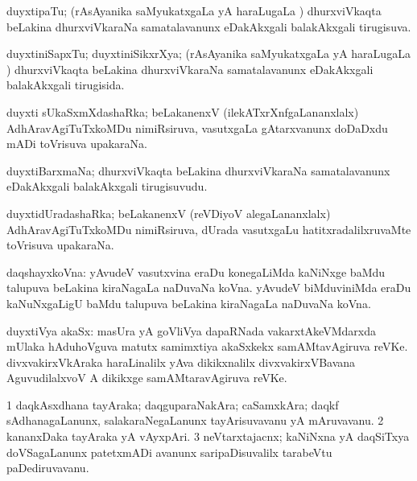 \bentry
{}
\gl{\gu}
\bmng
duyxtipaTu; (rAsAyanika saMyukatxgaLa yA haraLugaLa \vi) dhurxviVkaqta beLakina dhurxviVkaraNa samatalavanunx eDakAkxgali balakAkxgali tirugisuva. 
\emng
\eentry

\bentry
{}
\gl{\gu}
\bmng
duyxtiniSapxTu; duyxtiniSikxrXya; (rAsAyanika saMyukatxgaLa yA haraLugaLa \vi) dhurxviVkaqta beLakina dhurxviVkaraNa samatalavanunx eDakAkxgali balakAkxgali tirugisida. 
\emng
\eentry

\bentry
{}
\gl{\nA}
\bmng
duyxti sUkaSxmXdashaRka; beLakanenxV (ilekATxrXnfgaLananxlalx) AdhAravAgiTuTxkoMDu nimiRsiruva, vasutxgaLa gAtarxvanunx doDaDxdu mADi toVrisuva upakaraNa. 
\emng
\eentry

\bentry
{}
\gl{\nA}
\bmng
duyxtiBarxmaNa; dhurxviVkaqta beLakina dhurxviVkaraNa samatalavanunx eDakAkxgali balakAkxgali tirugisuvudu. 
\emng
\eentry


\bentry
{}
\gl{\nA}
\bmng
duyxtidUradashaRka; beLakanenxV (reVDiyoV alegaLananxlalx) AdhAravAgiTuTxkoMDu nimiRsiruva, dUrada vasutxgaLu hatitxradalilxruvaMte toVrisuva upakaraNa. 
\emng
\eentry

\bentry
{}
\gl{\nA}
\bmng
daqshayxkoVna: 
\banum
{} yAvudeV vasutxvina eraDu konegaLiMda kaNiNxge baMdu talupuva beLakina kiraNagaLa naDuvaNa koVna. 
 yAvudeV biMduviniMda eraDu kaNuNxgaLigU baMdu talupuva beLakina kiraNagaLa naDuvaNa koVna. 
\eanum
\emng
\eentry

\bentry
{}
\gl{\nA}
\bmng
duyxtiVya akaSx: 
\banum
{} masUra yA goVliVya dapaRNada vakarxtAkeVMdarxda mUlaka hAduhoVguva matutx samimxtiya akaSxkekx samAMtavAgiruva reVKe. 
 divxvakirxVkAraka haraLinalilx yAva dikikxnalilx divxvakirxVBavana AguvudilalxvoV A dikikxge samAMtaravAgiruva reVKe. 
\eanum
\emng
\eentry

\bentry
{}
\gl{\nA}
\bmng
\bnum
\num{1} daqkAsxdhana tayAraka; daqguparaNakAra; caSamxkAra; daqkf sAdhanagaLanunx, salakaraNegaLanunx tayArisuvavanu yA mAruvavanu. 
\num{2} kananxDaka tayAraka yA vAyxpAri. 
\num{3} neVtarxtajacnx; kaNiNxna yA daqSiTxya doVSagaLanunx patetxmADi avanunx saripaDisuvalilx tarabeVtu paDediruvavanu. 
\enum
\emng
\eentry

